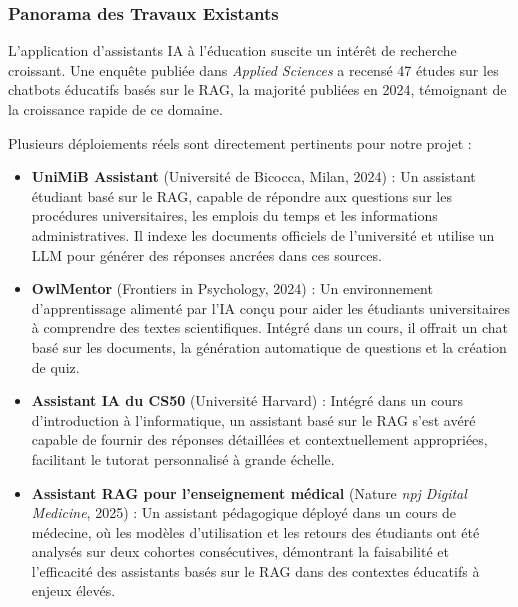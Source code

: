 \documentclass[a4paper,11pt]{article}
\begin{document}
\subsubsection{Panorama des Travaux Existants}

L'application d'assistants IA à l'éducation suscite un intérêt de recherche
croissant. Une enquête publiée dans \emph{Applied Sciences}
\cite{mdpi2025rag} a recensé 47 études sur les chatbots éducatifs basés sur
le RAG, la majorité publiées en 2024, témoignant de la croissance rapide de
ce domaine.

Plusieurs déploiements réels sont directement pertinents pour notre projet :

\begin{itemize}
  \item \textbf{UniMiB Assistant} (Université de Bicocca, Milan, 2024)
    \cite{unimib2024} : Un assistant étudiant basé sur le RAG, capable de
    répondre aux questions sur les procédures universitaires, les emplois du
    temps et les informations administratives. Il indexe les documents
    officiels de l'université et utilise un LLM pour générer des réponses
    ancrées dans ces sources.

  \item \textbf{OwlMentor} (Frontiers in Psychology, 2024)
    \cite{owlmentor2024} : Un environnement d'apprentissage alimenté par l'IA
    conçu pour aider les étudiants universitaires à comprendre des textes
    scientifiques. Intégré dans un cours, il offrait un chat basé sur les
    documents, la génération automatique de questions et la création de quiz.

  \item \textbf{Assistant IA du CS50} (Université Harvard) : Intégré dans un
    cours d'introduction à l'informatique, un assistant basé sur le RAG s'est
    avéré capable de fournir des réponses détaillées et contextuellement
    appropriées, facilitant le tutorat personnalisé à grande échelle.

  \item \textbf{Assistant RAG pour l'enseignement médical} (Nature
    \emph{npj Digital Medicine}, 2025) \cite{npj2025} : Un assistant
    pédagogique déployé dans un cours de médecine, où les modèles d'utilisation
    et les retours des étudiants ont été analysés sur deux cohortes
    consécutives, démontrant la faisabilité et l'efficacité des assistants
    basés sur le RAG dans des contextes éducatifs à enjeux élevés.
\end{itemize}
\end{document}
